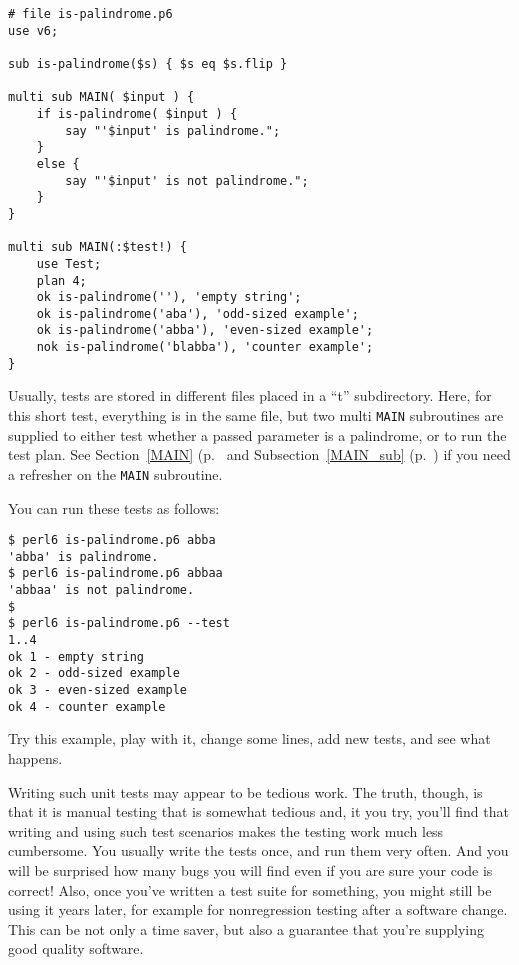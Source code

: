 \begin{verbatim}
# file is-palindrome.p6
use v6;

sub is-palindrome($s) { $s eq $s.flip }

multi sub MAIN( $input ) {
    if is-palindrome( $input ) {
        say "'$input' is palindrome.";
    }
    else {
        say "'$input' is not palindrome.";
    }
}

multi sub MAIN(:$test!) {
    use Test;
    plan 4;
    ok is-palindrome(''), 'empty string';
    ok is-palindrome('aba'), 'odd-sized example';
    ok is-palindrome('abba'), 'even-sized example';
    nok is-palindrome('blabba'), 'counter example';
}
\end{verbatim}

Usually, tests are stored in different files placed in a ``t'' 
subdirectory. Here, for this short test, everything is in the 
same file, but two multi {\tt MAIN} subroutines are supplied 
to either test whether a passed parameter is a palindrome, or to 
run the test plan. See Section~\ref{MAIN} (p.~\pageref{MAIN} 
and Subsection~\ref{MAIN_sub} (p.~\pageref{MAIN_sub})
if you need a refresher on the {\tt MAIN} subroutine.

You can run these tests as follows:

\begin{verbatim}
$ perl6 is-palindrome.p6 abba
'abba' is palindrome.
$ perl6 is-palindrome.p6 abbaa
'abbaa' is not palindrome.
$
$ perl6 is-palindrome.p6 --test
1..4
ok 1 - empty string
ok 2 - odd-sized example
ok 3 - even-sized example
ok 4 - counter example
\end{verbatim}

Try this example, play with it, change some lines, add 
new tests, and see what happens.

Writing such unit tests may appear to be tedious work. 
The truth, though, is that it is manual testing that is 
somewhat tedious and, it you try, you'll find that 
writing and using such test scenarios makes the testing 
work much less cumbersome. You usually write the tests 
once, and run them very often. And you will be surprised 
how many bugs you will find even if you are sure your 
code is correct! Also, once you've written 
a test suite for something, you might still be using it 
years later, for example for nonregression testing after 
a software change. This can be not only a time saver, but 
also a guarantee that you're supplying good quality software.

